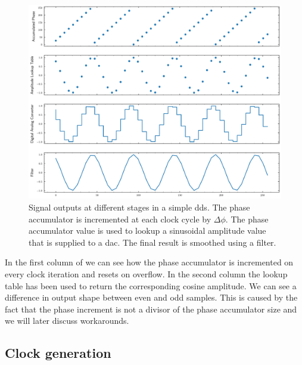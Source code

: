 \begin{figure}[htb]
  \centering
  \includegraphics[width=\textwidth]
  {../figure/digital-signal-synthesis/simple-output.pdf}
  \caption{Signal outputs at different stages in a simple \gls{dds}. The
    phase accumulator is incremented at each clock cycle by $\Delta\phi$. The
    phase accumulator value is used to lookup a sinusoidal amplitude value
    that is supplied to a \gls{dac}. The final result is smoothed using a
    filter.}\label{fig:dds_simple_output}
\end{figure}
In the first column of  we can see how the phase
accumulator is incremented on every clock iteration and resets on overflow.
In the second column the lookup table has been used to return the
corresponding cosine amplitude. We can see a difference in output shape
between even and odd samples. This is caused by the fact that the phase
increment is not a divisor of the phase accumulator size and we will later
discuss workarounds.

\subsection{Clock generation}

